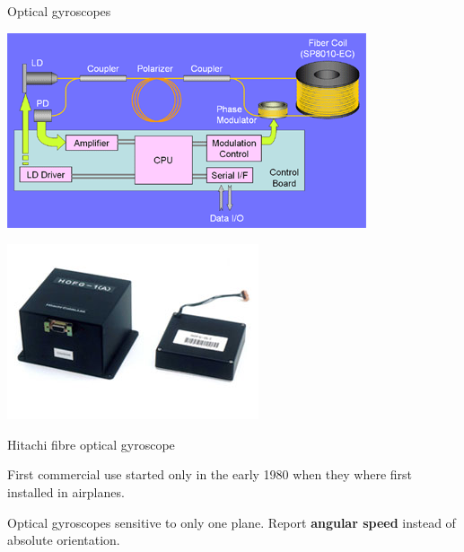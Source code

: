 \documentclass[compress]{beamer}
\begin{document}
\begin{frame}{Optical gyroscopes}

\begin{multicols}{2}

    \begin{center}
        \includegraphics[width=0.9\linewidth]{optical-gyro}
    \end{center}

    \begin{center}
        \includegraphics[width=0.7\linewidth]{optical-gyro2}
    \end{center}

Hitachi fibre optical gyroscope
\vfill
\columnbreak

First commercial use started only in the early 1980 when they where
first installed in airplanes.

Optical gyroscopes sensitive to only one plane. Report {\bf angular speed}
instead of absolute orientation.


\end{multicols}

\end{frame}
\end{document}
